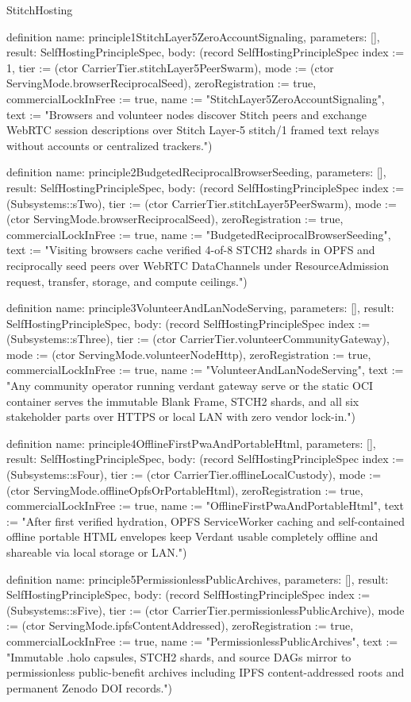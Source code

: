 \begin{lexlean}{StitchHosting}
\begin{semanticmodule}
definition{
  name: principle1StitchLayer5ZeroAccountSignaling,
  parameters: [],
  result: SelfHostingPrincipleSpec,
  body: (record SelfHostingPrincipleSpec {index := 1, tier := (ctor CarrierTier.stitchLayer5PeerSwarm), mode := (ctor ServingMode.browserReciprocalSeed), zeroRegistration := true, commercialLockInFree := true, name := "StitchLayer5ZeroAccountSignaling", text := "Browsers and volunteer nodes discover Stitch peers and exchange WebRTC session descriptions over Stitch Layer-5 stitch/1 framed text relays without accounts or centralized trackers."})
}

definition{
  name: principle2BudgetedReciprocalBrowserSeeding,
  parameters: [],
  result: SelfHostingPrincipleSpec,
  body: (record SelfHostingPrincipleSpec {index := (Subsystems::sTwo), tier := (ctor CarrierTier.stitchLayer5PeerSwarm), mode := (ctor ServingMode.browserReciprocalSeed), zeroRegistration := true, commercialLockInFree := true, name := "BudgetedReciprocalBrowserSeeding", text := "Visiting browsers cache verified 4-of-8 STCH2 shards in OPFS and reciprocally seed peers over WebRTC DataChannels under ResourceAdmission request, transfer, storage, and compute ceilings."})
}

definition{
  name: principle3VolunteerAndLanNodeServing,
  parameters: [],
  result: SelfHostingPrincipleSpec,
  body: (record SelfHostingPrincipleSpec {index := (Subsystems::sThree), tier := (ctor CarrierTier.volunteerCommunityGateway), mode := (ctor ServingMode.volunteerNodeHttp), zeroRegistration := true, commercialLockInFree := true, name := "VolunteerAndLanNodeServing", text := "Any community operator running verdant gateway serve or the static OCI container serves the immutable Blank Frame, STCH2 shards, and all six stakeholder parts over HTTPS or local LAN with zero vendor lock-in."})
}

definition{
  name: principle4OfflineFirstPwaAndPortableHtml,
  parameters: [],
  result: SelfHostingPrincipleSpec,
  body: (record SelfHostingPrincipleSpec {index := (Subsystems::sFour), tier := (ctor CarrierTier.offlineLocalCustody), mode := (ctor ServingMode.offlineOpfsOrPortableHtml), zeroRegistration := true, commercialLockInFree := true, name := "OfflineFirstPwaAndPortableHtml", text := "After first verified hydration, OPFS ServiceWorker caching and self-contained offline portable HTML envelopes keep Verdant usable completely offline and shareable via local storage or LAN."})
}

definition{
  name: principle5PermissionlessPublicArchives,
  parameters: [],
  result: SelfHostingPrincipleSpec,
  body: (record SelfHostingPrincipleSpec {index := (Subsystems::sFive), tier := (ctor CarrierTier.permissionlessPublicArchive), mode := (ctor ServingMode.ipfsContentAddressed), zeroRegistration := true, commercialLockInFree := true, name := "PermissionlessPublicArchives", text := "Immutable .holo capsules, STCH2 shards, and source DAGs mirror to permissionless public-benefit archives including IPFS content-addressed roots and permanent Zenodo DOI records."})
}


\end{semanticmodule}
\end{lexlean}
